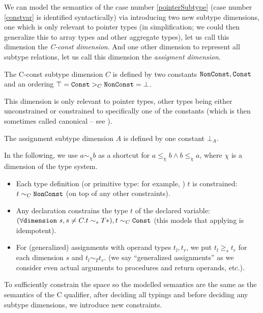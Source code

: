 We can model the semantics of the case number \ref{pointerSubtype} (case number \ref{constvar} is identified syntactically) via introducing two new subtype dimensions, one which is only relevant to pointer types (in simplification; we could then generalize this to array types and other aggregate types), let us call this dimension the \emph{C-const dimension}. And one other dimension to represent all subtype relations, let us call this dimension the \emph{assigment dimension}.

\begin{defn}
    The C-const subtype dimension $C$ is defined by two constants $\mathtt{NonConst}, \mathtt{Const}$ and an ordering $\top = \mathtt{Const} >_C \mathtt{NonConst} = \bot$.

    This dimension is only relevant to pointer types, other types being either unconstrained or constrained to specifically one of the constants (which is then sometimes called canonical -- see \cite{tiuryn1999subtyping}).
\end{defn}

\begin{defn}
    The assignment subtype dimension $A$ is defined by one constant $\bot_A$.
\end{defn}

In the following, we use $a \sim_\chi b$ as a shortcut for $a \leq_\chi b \land b \leq_\chi a$, where $\chi$ is a dimension of the type system.

\begin{itemize}
    \item Each type definition (or primitive type: for example, ) $t$ is constrained: $t \sim_C \mathtt{NonConst}$ (on top of any other constraints).

    \item Any declaration  constrains the type $t$ of the declared variable: $(\forall \mathtt{dimension}\ s, s \neq C. t \sim_s T\ast), t \sim_C \mathtt{Const}$ (this models that applying  is idempotent).

    \item For (generalized) assignments with operand types $t_l, t_r$, we put $t_l \geq_s t_r$ for each dimension $s$ and $t_l \sim_T t_r$. (we say ``generalized assignments'' as we consider even actual arguments to procedures and return operands, etc.).
\end{itemize}

To sufficiently constrain the space so the modelled semantics are the same as the semantics of the C  qualifier, after deciding all typings and before deciding any subtype dimensions, we introduce new constraints.


